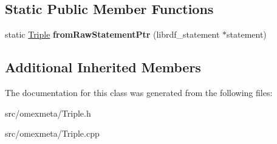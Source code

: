 \subsection*{Static Public Member Functions}
\begin{DoxyCompactItemize}
\item 
\mbox{\label{classomexmeta_1_1Triple_af03c0ce3392c0ff30f13772209ac873c}} 
static \hyperlink{classomexmeta_1_1Triple}{Triple} {\bfseries from\+Raw\+Statement\+Ptr} (librdf\+\_\+statement $\ast$statement)
\end{DoxyCompactItemize}
\subsection*{Additional Inherited Members}


The documentation for this class was generated from the following files\+:\begin{DoxyCompactItemize}
\item 
src/omexmeta/Triple.\+h\item 
src/omexmeta/Triple.\+cpp\end{DoxyCompactItemize}
